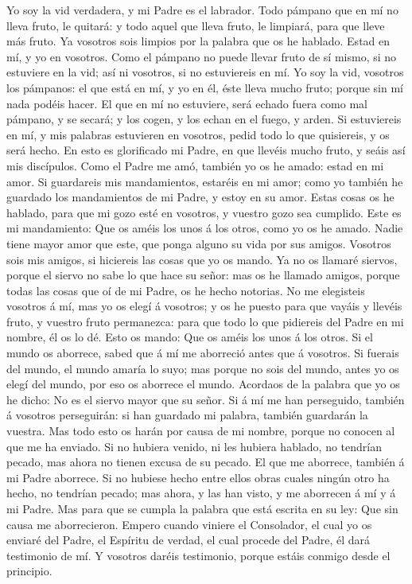  Yo soy la vid verdadera, y mi Padre es el labrador.
 Todo pámpano que en mí no lleva fruto, le quitará: y todo
aquel que lleva fruto, le limpiará, para que lleve más fruto.
 Ya vosotros sois limpios por la palabra que os he hablado.
 Estad en mí, y yo en vosotros. Como el pámpano no puede
llevar fruto de sí mismo, si no estuviere en la vid; así ni vosotros, si
no estuviereis en mí.  Yo soy la vid, vosotros los pámpanos:
el que está en mí, y yo en él, éste lleva mucho fruto; porque sin mí
nada podéis hacer.  El que en mí no estuviere, será echado
fuera como mal pámpano, y se secará; y los cogen, y los echan en el
fuego, y arden.  Si estuviereis en mí, y mis palabras
estuvieren en vosotros, pedid todo lo que quisiereis, y os será hecho.
 En esto es glorificado mi Padre, en que llevéis mucho
fruto, y seáis así mis discípulos.  Como el Padre me amó,
también yo os he amado: estad en mi amor.  Si guardareis
mis mandamientos, estaréis en mi amor; como yo también he guardado los
mandamientos de mi Padre, y estoy en su amor.  Estas cosas
os he hablado, para que mi gozo esté en vosotros, y vuestro gozo sea
cumplido.  Este es mi mandamiento: Que os améis los unos á
los otros, como yo os he amado.  Nadie tiene mayor amor que
este, que ponga alguno su vida por sus amigos.  Vosotros
sois mis amigos, si hiciereis las cosas que yo os mando. 
Ya no os llamaré siervos, porque el siervo no sabe lo que hace su señor:
mas os he llamado amigos, porque todas las cosas que oí de mi Padre, os
he hecho notorias.  No me elegisteis vosotros á mí, mas yo
os elegí á vosotros; y os he puesto para que vayáis y llevéis fruto, y
vuestro fruto permanezca: para que todo lo que pidiereis del Padre en mi
nombre, él os lo dé.  Esto os mando: Que os améis los unos
á los otros.  Si el mundo os aborrece, sabed que á mí me
aborreció antes que á vosotros.  Si fuerais del mundo, el
mundo amaría lo suyo; mas porque no sois del mundo, antes yo os elegí
del mundo, por eso os aborrece el mundo.  Acordaos de la
palabra que yo os he dicho: No es el siervo mayor que su señor. Si á mí
me han perseguido, también á vosotros perseguirán: si han guardado mi
palabra, también guardarán la vuestra.  Mas todo esto os
harán por causa de mi nombre, porque no conocen al que me ha enviado.
 Si no hubiera venido, ni les hubiera hablado, no tendrían
pecado, mas ahora no tienen excusa de su pecado.  El que me
aborrece, también á mi Padre aborrece.  Si no hubiese hecho
entre ellos obras cuales ningún otro ha hecho, no tendrían pecado; mas
ahora, y las han visto, y me aborrecen á mí y á mi Padre. 
Mas para que se cumpla la palabra que está escrita en su ley: Que sin
causa me aborrecieron.  Empero cuando viniere el
Consolador, el cual yo os enviaré del Padre, el Espíritu de verdad, el
cual procede del Padre, él dará testimonio de mí.  Y
vosotros daréis testimonio, porque estáis conmigo desde el principio.

